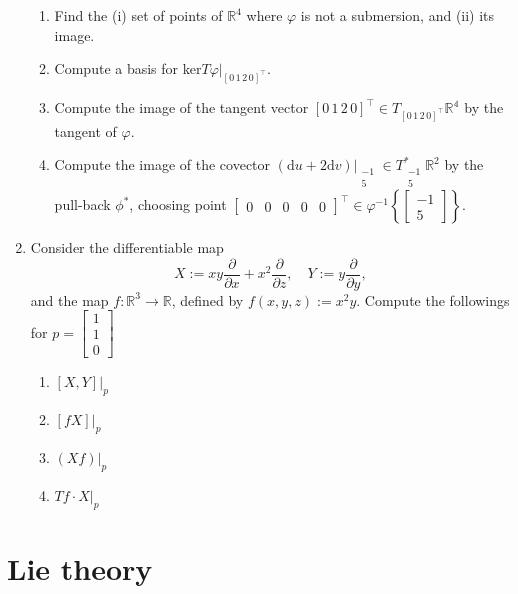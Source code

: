 \documentclass{article}
\begin{document}
\begin{enumerate}[start=19]
  \begin{enumerate}
    \item Find the (i) set of points of $\mathbb{R}^{4}$ where $\varphi$ is not a submersion, and (ii) its image.
    \item Compute a basis for ker$T\varphi\Big|_{[0\,1\,2\,0]^{\top}}$.
    \item Compute the image of the tangent vector $[0\,1\,2\,0]^{\top}\in T_{[0\,1\,2\,0]^{\top}}\mathbb{R^{4}}$ by the tangent of $\varphi$.
    \item Compute the image of the covector $(\text{d}u+2\text{d}v)\Big|_{\begin{smallmatrix}-1\\5\end{smallmatrix}}\in T^{*}_{\begin{smallmatrix}-1\\5\end{smallmatrix}}\mathbb{R}^{2}$ by the pull-back $\phi^{*}$, choosing point $\begin{bmatrix}0&0&0&0&0\end{bmatrix}^{\top}\in\varphi^{-1}\left\{\begin{bmatrix}-1\\5\end{bmatrix}\right\}.$
  \end{enumerate}

  \item Consider the differentiable map
  $$
  X:=xy\frac{\partial}{\partial x}+x^{2}\frac{\partial}{\partial z},\quad Y:=y\frac{\partial}{\partial y},
  $$
  and the map $f:\mathbb{R}^{3}\rightarrow\mathbb{R}$, defined by $f(x,y,z):=x^{2}y$. Compute the followings for $p=\begin{bmatrix}1\\1\\0\end{bmatrix}$

  \begin{enumerate}
    \item $[X,Y]\Big|_{p}$
    \item $[fX]\Big|_{p}$
    \item $(Xf)\Big|_{p}$
    \item $Tf\cdot X|_{p}$
  \end{enumerate}

\end{enumerate}

\section{Lie theory}
\end{document}
